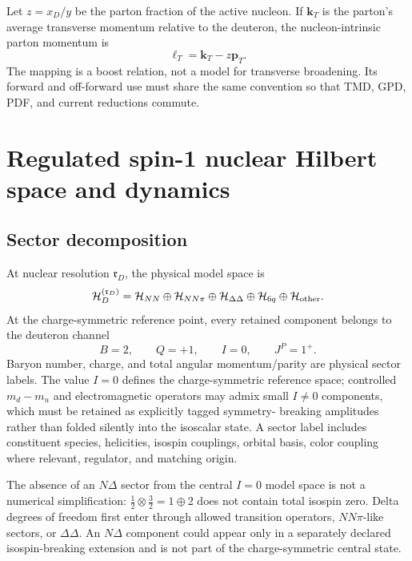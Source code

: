 \documentclass[11pt]{article}
\newcommand{\kT}{\bm{k}_{T}}
\newcommand{\ellT}{\bm{\ell}_{T}}
\newcommand{\pT}{\bm{p}_{T}}
\newcommand{\Hil}{\mathcal H}
\newcommand{\NN}{NN}
\newcommand{\NNpi}{NN\pi}
\newcommand{\DD}{\Delta\Delta}
\newcommand{\sixq}{6q}
\begin{document}
Let \(z=x_D/y\) be the parton fraction of the active nucleon.  If \(\kT\) is
the parton's average transverse momentum relative to the deuteron, the
nucleon-intrinsic parton momentum is
\begin{equation}
 \ellT=\kT-z\pT.
\label{eq:parton-nucleon-transverse-map}
\end{equation}
The mapping is a boost relation, not a model for transverse broadening.  Its
forward and off-forward use must share the same convention so that TMD, GPD,
PDF, and current reductions commute.

\section{Regulated spin-1 nuclear Hilbert space and dynamics}
\label{sec:nuclear-hilbert}

\subsection{Sector decomposition}

At nuclear resolution \(\mathfrak r_D\), the physical model space is
\begin{equation}
 \Hil_D^{(\mathfrak r_D)}
 =\Hil_{\NN}
 \oplus\Hil_{\NNpi}
 \oplus\Hil_{\DD}
 \oplus\Hil_{\sixq}
 \oplus\Hil_{\rm other}.
\label{eq:nuclear-hilbert-sum}
\end{equation}
At the charge-symmetric reference point, every retained component belongs to
the deuteron channel
\begin{equation}
 B=2,
 \qquad Q=+1,
 \qquad I=0,
 \qquad J^P=1^+.
\label{eq:deuteron-quantum-numbers}
\end{equation}
Baryon number, charge, and total angular momentum/parity are physical sector
labels.  The value \(I=0\) defines the charge-symmetric reference space;
controlled \(m_d-m_u\) and electromagnetic operators may admix small
\(I\neq0\) components, which must be retained as explicitly tagged symmetry-
breaking amplitudes rather than folded silently into the isoscalar state.  A
sector label includes constituent species, helicities, isospin couplings,
orbital basis, color coupling where relevant, regulator, and matching origin.

The absence of an \(N\Delta\) sector from the central \(I=0\) model space is
not a numerical simplification: \(\tfrac12\otimes\tfrac32=1\oplus2\) does not
contain total isospin zero.  Delta degrees of freedom first enter through
allowed transition operators, \(NN\pi\)-like sectors, or \(\Delta\Delta\).
An \(N\Delta\) component could appear only in a separately declared
isospin-breaking extension and is not part of the charge-symmetric central
state.
\end{document}
